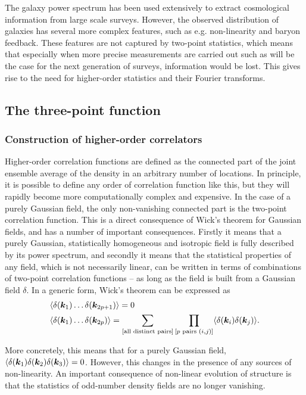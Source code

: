 The galaxy power spectrum has been used extensively to extract cosmological information from large scale surveys. However, the observed distribution of galaxies has several more complex features, such as e.g. non-linearity and baryon feedback. These features are not captured by two-point statistics, which means that especially when more precise measurements are carried out such as will be the case for the next generation of surveys, information would be lost. This gives rise to the need for higher-order statistics and their Fourier transforms. 

\subsection{The three-point function}

\subsubsection{Construction of higher-order correlators}

Higher-order correlation functions are defined as the connected part of the joint ensemble average of the density in an arbitrary number of locations. In principle, it is possible to define any order of correlation function like this, but they will rapidly become more computationally complex and expensive. In the case of a purely Gaussian field, the only non-vanishing connected part is the two-point correlation function. This is a direct consequence of Wick's theorem for Gaussian fields, and has a number of important consequences. Firstly it means that a purely Gaussian, statistically homogeneous and isotropic field is fully described by its power spectrum, and secondly it means that the statistical properties of any field, which is not necessarily linear, can be written in terms of combinations of two-point correlation functions -- as long as the field is built from a Gaussian field $\delta$. In a generic form, Wick's theorem can be expressed as 
\begin{align}
	&\langle \delta(\bm {k}_1) \ldots \delta(\bm{k}_{2p + 1}) \rangle = 0 \nonumber \\
	&\langle \delta(\bm {k}_1) \ldots \delta(\bm{k}_{2p})\rangle = \sum_{[\text{all distinct pairs}]} \prod_{[p \text{ pairs } (i,j)]} \langle \delta(\bm{k}_i) \delta(\bm{k}_j) \rangle.  
\end{align}

More concretely, this means that for a purely Gaussian field, $\langle \delta(\bm {k}_1) \delta(\bm {k}_2) \delta(\bm {k}_3)\rangle = 0$. However, this changes in the presence of any sources of non-linearity. An important consequence of non-linear evolution of structure is that the statistics of odd-number density fields are no longer vanishing. 

